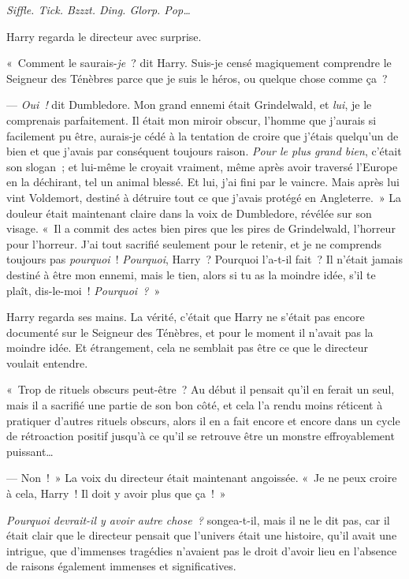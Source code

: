 \later

\emph{Siffle. Tick. Bzzzt. Ding. Glorp. Pop…}

Harry regarda le directeur avec surprise.

«~Comment le saurais-\emph{je}~? dit Harry. Suis-je censé magiquement comprendre le Seigneur des Ténèbres parce que je suis le héros, ou quelque chose comme ça~?

--- \emph{Oui~!} dit Dumbledore. Mon grand ennemi était Grindelwald, et \emph{lui}, je le comprenais parfaitement. Il était mon miroir obscur, l'homme que j'aurais si facilement pu être, aurais-je cédé à la tentation de croire que j'étais quelqu'un de bien et que j'avais par conséquent toujours raison. \emph{Pour le plus grand bien}, c'était son slogan~; et lui-même le croyait vraiment, même après avoir traversé l'Europe en la déchirant, tel un animal blessé. Et lui, j'ai fini par le vaincre. Mais après lui vint Voldemort, destiné à détruire tout ce que j'avais protégé en Angleterre.~» La douleur était maintenant claire dans la voix de Dumbledore, révélée sur son visage. «~Il a commit des actes bien pires que les pires de Grindelwald, l'horreur pour l'horreur. J'ai tout sacrifié seulement pour le retenir, et je ne comprends toujours pas \emph{pourquoi}~! \emph{Pourquoi}, Harry~? Pourquoi l'a-t-il fait~? Il n'était jamais destiné à être mon ennemi, mais le tien, alors si tu as la moindre idée, s'il te plaît, dis-le-moi~! \emph{Pourquoi~?}~»

Harry regarda ses mains. La vérité, c'était que Harry ne s'était pas encore documenté sur le Seigneur des Ténèbres, et pour le moment il n'avait pas la moindre idée. Et étrangement, cela ne semblait pas être ce que le directeur voulait entendre.

«~Trop de rituels obscurs peut-être~? Au début il pensait qu'il en ferait un seul, mais il a sacrifié une partie de son bon côté, et cela l'a rendu moins réticent à pratiquer d'autres rituels obscurs, alors il en a fait encore et encore dans un cycle de rétroaction positif jusqu'à ce qu'il se retrouve être un monstre effroyablement puissant…

--- Non~!~» La voix du directeur était maintenant angoissée. «~Je ne peux croire à cela, Harry~! Il doit y avoir plus que ça~!~»

\emph{Pourquoi devrait-il y avoir autre chose~?} songea-t-il, mais il ne le dit pas, car il était clair que le directeur pensait que l'univers était une histoire, qu'il avait une intrigue, que d'immenses tragédies n'avaient pas le droit d'avoir lieu en l'absence de raisons également immenses et significatives.

